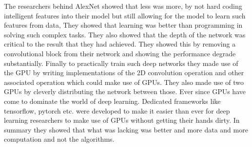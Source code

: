 \documentclass{../template/texnote}
\begin{document}
The researchers behind AlexNet showed that less was more, by not hard coding intelligent features into their model but still allowing for the model to learn such features from data, 
They showed that learning was better than programming in solving such complex tasks.
They also showed that the depth of the network was critical to the result that they had achieved. They showed this by removing a convolutional block from their network and showing the 
performance degrade substantially.
Finally to practically train such deep networks they made use of the GPU by writing implementations of the 2D convolution operation and other associated operation which could make use of 
GPUs. They also made use of two GPUs by cleverly distributing the network between those.
Ever since GPUs have come to dominate the world of deep learning.
Dedicated frameworks like tensorflow, pytorch etc. were developed to make it easier than ever for deep learning researchers to make use of GPUs without getting their hands dirty.
In summary they showed that what was lacking was better and more data and more computation and not the algorithms.
\end{document}
